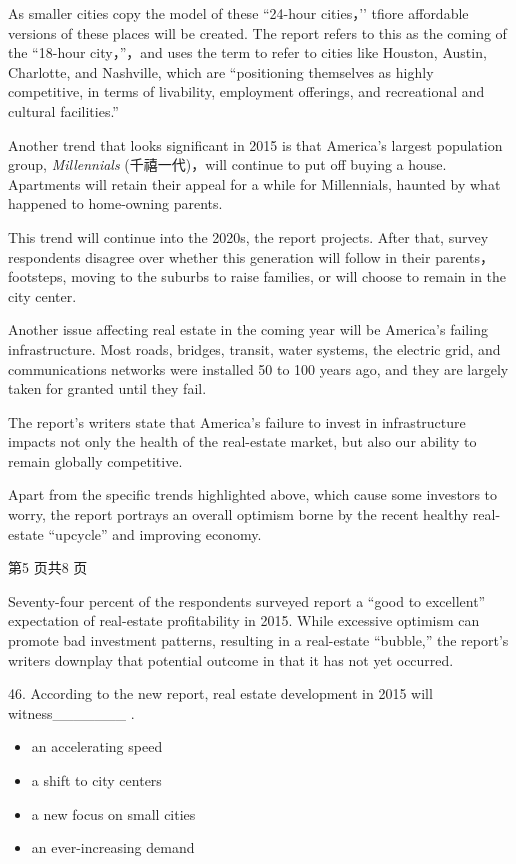 \documentclass[UTF8,11pt]{ctexart}
\begin{document}
As smaller cities copy the model of these “24-hour cities，’’ tfiore affordable versions of these places will be created. The report refers to this as the coming of the “18-hour city，”，and uses the term to refer to cities like Houston, Austin, Charlotte, and Nashville, which are “positioning themselves as highly competitive, in terms of livability, employment offerings, and recreational and cultural facilities.”


Another trend that looks significant in 2015 is that America’s largest population group,\textit{ Millennials} (千禧一代)，will continue to put off buying a house. Apartments will retain their appeal for a while for Millennials, haunted by what happened to home-owning parents.


This trend will continue into the 2020s, the report projects. After that, survey respondents disagree over whether this generation will follow in their parents，footsteps, moving to the suburbs to raise families, or will choose to remain in the city center.


Another issue affecting real estate in the coming year will be America’s failing infrastructure. Most roads, bridges, transit, water systems, the electric grid, and communications networks were installed 50 to 100 years ago, and they are largely taken for granted until they fail.


The report’s writers state that America’s failure to invest in infrastructure impacts not only the health of the real-estate market, but also our ability to remain globally competitive.


Apart from the specific trends highlighted above, which cause some investors to worry, the report portrays an overall optimism borne by the recent healthy real-estate “upcycle” and improving economy.


第5 页共8 页


Seventy-four percent of the respondents surveyed report a “good to excellent” expectation of real-estate profitability in 2015. While excessive optimism can promote bad investment patterns, resulting in a real-estate “bubble,” the report’s writers downplay that potential outcome in that it has not yet occurred.


46. According to the new report, real estate development in 2015 will witness\_\_\_\_\_\_\_ .


\begin{itemize}[leftmargin=2em,itemsep=.2em,topsep=.4em]\item[A.] an accelerating speed
\item[B.] a shift to city centers
\item[C.] a new focus on small cities
\item[D.] an ever-increasing demand
\end{itemize}
\end{document}
